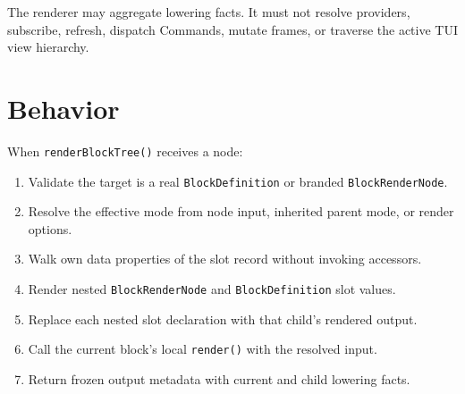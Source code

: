 The renderer may aggregate lowering facts. It must not resolve providers, subscribe, refresh, dispatch Commands, mutate frames, or traverse the active TUI view hierarchy.

\section{Behavior}\label{record-129-behavior}

When \texttt{r\allowbreak{}e\allowbreak{}n\allowbreak{}d\allowbreak{}e\allowbreak{}r\allowbreak{}B\allowbreak{}l\allowbreak{}o\allowbreak{}c\allowbreak{}k\allowbreak{}T\allowbreak{}r\allowbreak{}e\allowbreak{}e\allowbreak{}(\allowbreak{})} receives a node:

\begin{enumerate}
\def\labelenumi{\arabic{enumi}.}
\tightlist
\item
  Validate the target is a real \texttt{B\allowbreak{}l\allowbreak{}o\allowbreak{}c\allowbreak{}k\allowbreak{}D\allowbreak{}e\allowbreak{}f\allowbreak{}i\allowbreak{}n\allowbreak{}i\allowbreak{}t\allowbreak{}i\allowbreak{}o\allowbreak{}n} or branded \texttt{B\allowbreak{}l\allowbreak{}o\allowbreak{}c\allowbreak{}k\allowbreak{}R\allowbreak{}e\allowbreak{}n\allowbreak{}d\allowbreak{}e\allowbreak{}r\allowbreak{}N\allowbreak{}o\allowbreak{}d\allowbreak{}e}.
\item
  Resolve the effective mode from node input, inherited parent mode, or render options.
\item
  Walk own data properties of the slot record without invoking accessors.
\item
  Render nested \texttt{B\allowbreak{}l\allowbreak{}o\allowbreak{}c\allowbreak{}k\allowbreak{}R\allowbreak{}e\allowbreak{}n\allowbreak{}d\allowbreak{}e\allowbreak{}r\allowbreak{}N\allowbreak{}o\allowbreak{}d\allowbreak{}e} and \texttt{B\allowbreak{}l\allowbreak{}o\allowbreak{}c\allowbreak{}k\allowbreak{}D\allowbreak{}e\allowbreak{}f\allowbreak{}i\allowbreak{}n\allowbreak{}i\allowbreak{}t\allowbreak{}i\allowbreak{}o\allowbreak{}n} slot values.
\item
  Replace each nested slot declaration with that child's rendered output.
\item
  Call the current block's local \texttt{r\allowbreak{}e\allowbreak{}n\allowbreak{}d\allowbreak{}e\allowbreak{}r\allowbreak{}(\allowbreak{})} with the resolved input.
\item
  Return frozen output metadata with current and child lowering facts.
\end{enumerate}

